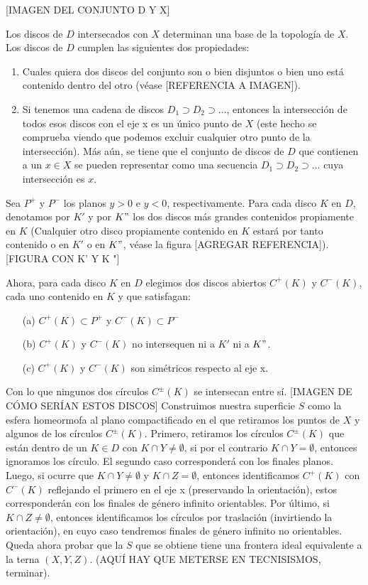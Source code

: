 \documentclass[a4paper,11pt,spanish, twoside, leqno]{tfg-uam}
\theoremstyle{definition}
\begin{document}
[IMAGEN DEL CONJUNTO D Y X]

Los discos de $D$ intersecados con $X$ determinan una base de la topología de $X$. Los discos de $D$ cumplen las siguientes dos propiedades:
\begin{enumerate}
\item Cuales quiera dos discos del conjunto son o bien disjuntos o bien uno está contenido dentro del otro (véase [REFERENCIA A IMAGEN]).
\item Si tenemos una cadena de discos $D_1 \supset D_2 \supset \ldots$, entonces la intersección de todos esos discos  con el eje x es un único punto de $X$ (este hecho se comprueba viendo que podemos excluir cualquier otro punto de la intersección). Más aún, se tiene que el conjunto de discos de $D$ que contienen a un $x \in X$ se pueden representar como una secuencia $D_1 \supset D_2 \supset \ldots$ cuya intersección es $x$.
\end{enumerate}
Sea $P^+$ y $P^-$ los planos $y > 0 $ e $y < 0$, respectivamente. Para cada disco $K$ en $D$, denotamos por $K'$ y por $K"$ los dos discos más grandes contenidos propiamente en $K$ (Cualquier otro disco propiamente contenido en $K$ estará por tanto contenido o en $K'$ o en $K"$, véase la figura [AGREGAR REFERENCIA]).
[FIGURA CON K' Y K "]

Ahora, para cada disco $K$ en $D$ elegimos dos discos abiertos $C^+(K)$ y $C^-(K)$, cada uno contenido en $K$  y que satisfagan:
\begin{enumerate}
\item[(a)] $C^+(K) \subset P^+$ y $C^-(K) \subset P^-$
\item[(b)] $C^+(K)$ y $C^-(K)$ no intersequen ni a $K'$ ni a $K"$.
\item[(c)] $C^+(K)$ y $C^-(K)$ son simétricos respecto al eje x.
\end{enumerate}
Con lo que ningunos dos círculos $C^\pm(K)$ se intersecan entre sí.
[IMAGEN DE CÓMO SERÍAN ESTOS DISCOS]
Construimos nuestra superficie $S$ como la esfera homeormofa al plano compactificado en el que retiramos los puntos de $X$ y algunos de los círculos $C^\pm(K)$. Primero, retiramos los círculos $C^\pm(K)$ que están dentro de un $K\in D$ con $K \cap Y \neq \emptyset$, si por el contrario  $K \cap Y = \emptyset$, entonces ignoramos los círculo. El segundo caso corresponderá con los finales planos. Luego,  si ocurre que $K \cap Y \neq \emptyset$  y $K \cap Z = \emptyset$, entonces identificamos $C^+(K)$ con $C^-(K)$ reflejando el primero en el eje x (preservando la orientación), estos corresponderán con los finales de género infinito orientables.  Por último, si $K \cap Z \neq \emptyset$, entonces identificamos los círculos por traslación (invirtiendo la orientación), en cuyo caso tendremos finales de género infinito no orientables.\\
Queda ahora probar que la $S$ que se obtiene tiene una frontera ideal equivalente a la terna $(X,Y,Z)$. (AQUÍ HAY QUE METERSE EN TECNISISMOS, terminar).
\end{document}
